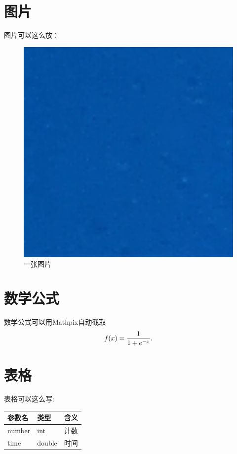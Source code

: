 \documentclass{ctexart}
\begin{document}
\section{图片}

图片可以这么放：
\begin{figure}[h]
\centering
\includegraphics[width=1\textwidth]{image_part_002.jpg}
\caption{一张图片}
\label{fig:latex}
\end{figure}


\section{数学公式}
数学公式可以用Mathpix自动截取
\begin{equation}
\label{eq:sigmoid}
\centering{f(x) = \frac{1}{1 + e^{-x}}}.
\end{equation}

\section{表格}
表格可以这么写:

\begin{tabular}{|p{8em}|p{8em}|p{24em}|} %
\hline 
参数名&类型&含义\\
\hline  
number & int & 计数\\
\hline 
time &double&时间\\
\hline 
\end{tabular}
\end{document}
